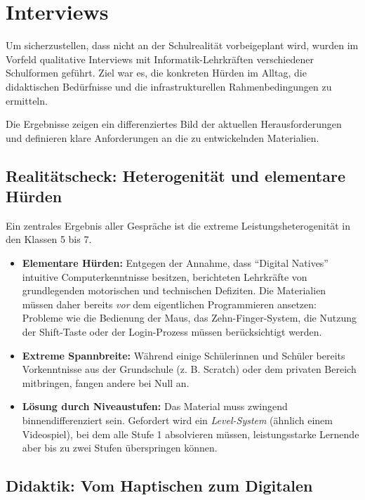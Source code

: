 \documentclass[a5paper,pagesize,10pt,bibtotoc,pointlessnumbers,
normalheadings,DIV=9,twoside=false]{scrbook}
\begin{document}
\section*{Interviews}

Um sicherzustellen, dass nicht an der Schulrealität vorbeigeplant wird, wurden im Vorfeld qualitative Interviews mit Infor\-matik-Lehrkräften verschiedener Schulformen geführt. Ziel war es, die konkreten Hürden im Alltag, die didaktischen Bedürfnisse und die infrastrukturellen Rahmenbedingungen zu ermitteln.

Die Ergebnisse zeigen ein differenziertes Bild der aktuellen Herausforderungen und definieren klare Anforderungen an die zu entwickelnden Materialien.

\subsection*{Realitätscheck: Heterogenität und elementare Hürden}

Ein zentrales Ergebnis aller Gespräche ist die extreme Leistungsheterogenität in den Klassen 5 bis 7.

\begin{itemize}
    \item \textbf{Elementare Hürden:} Entgegen der Annahme, dass ``Digital Natives'' intuitive Computerkenntnisse besitzen, berichteten Lehrkräfte von grundlegenden motorischen und technischen Defiziten. Die Materialien müssen daher bereits \textit{vor} dem eigentlichen Programmieren ansetzen: Probleme wie die Bedienung der Maus, das Zehn-Finger-System, die Nutzung der Shift-Taste oder der Login-Pro\-zess müssen berücksichtigt werden.
    \item \textbf{Extreme Spannbreite:} Während einige Schülerinnen und Schüler bereits Vorkenntnisse aus der Grundschule (z. B. Scratch) oder dem privaten Bereich mitbringen, fangen andere bei Null an.
    \item \textbf{Lösung durch Niveaustufen:} Das Material muss zwingend binnendifferenziert sein. Gefordert wird ein \textit{Level-System} (ähnlich einem Videospiel), bei dem alle Stufe 1 absolvieren müssen, leistungsstarke Lernende aber bis zu zwei Stufen überspringen können.
\end{itemize}

\subsection*{Didaktik: Vom Haptischen zum Digitalen}
\end{document}
